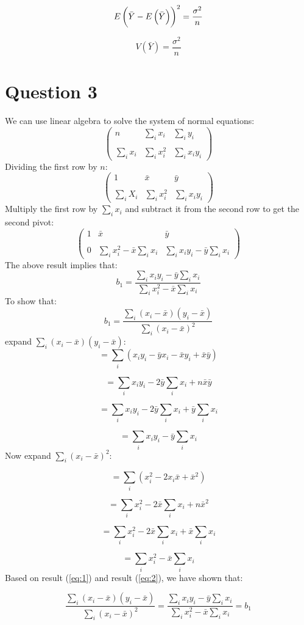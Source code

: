 \documentclass[12pt,a4paper]{article}
\begin{document}
\[
E \left(\bar{Y}-E \left(\bar{Y}\right)\right)^2 = \dfrac{\sigma^2}{n}
\]

\[
V\left(\bar{Y}\right) = \dfrac{\sigma^2}{n}
\]
\clearpage
\section*{Question 3}
We can use linear algebra to solve the system of normal equations:
\[
\begin{pmatrix}
n & \sum_i x_i & \sum_i y_i\\
\\
\sum_i x_i & \sum_i x_i^2 & \sum_i x_i y_i
\end{pmatrix}
\]
Dividing the first row by $n$:
\[
\begin{pmatrix}
1 & \bar{x} & \bar{y}\\
\\
\sum_i X_i & \sum_i x_i^2 & \sum_i x_i y_i
\end{pmatrix}
\]
Multiply the first row by $\sum_i x_i$ and subtract it from the second row to get the second pivot:
\[
\begin{pmatrix}
1 & \bar{x} & \bar{y}\\
\\
0 & \sum_i x_i^2 - \bar{x}\sum_i x_i & \sum_i x_i y_i
 - \bar{y}\sum_i x_i
 \end{pmatrix}
\]
The above result implies that:
\[
b_1 = \dfrac{\sum_i x_i y_i
 - \bar{y}\sum_i x_i}{\sum_i x_i^2 - \bar{x}\sum_i x_i}
\]
To show that:
\[
b_1 = \dfrac{\sum_i\left(x_i-\bar{x}\right)\left(y_i - \bar{x}\right)}{\sum_i\left(x_i-\bar{x}\right)^2}
\]
expand $\sum_i\left(x_i-\bar{x}\right)\left(y_i - \bar{x}\right)$:
\[
= \sum_i\left(x_iy_i-\bar{y}x_i-\bar{x}y_i+\bar{x}\bar{y}\right)
\]

\[
= \sum_i x_i y_i-2\bar{y}\sum_i x_i+n\bar{x}\bar{y}
\]

\[
= \sum_i x_i y_i-2\bar{y}\sum_i x_i+\bar{y}\sum_i x_i
\]

\begin{equation} \label{eq:1}
= \sum_i x_i y_i-\bar{y}\sum_i x_i
\end{equation}
Now expand $\sum_i\left(x_i-\bar{x}\right)^2$:

\[
=\sum_i \left(x_i^2-2x_i\bar{x}+\bar{x}^2\right)
\]

\[
=\sum_i x_i^2-2\bar{x} \sum_i x_i+n \bar{x}^2
\]

\[
=\sum_i x_i^2-2\bar{x} \sum_i x_i+\bar{x}\sum_i x_i
\]

\begin{equation} \label{eq:2}
=\sum_i x_i^2-\bar{x} \sum_i x_i
\end{equation}
Based on result (\ref{eq:1}) and result (\ref{eq:2}), we have shown that:

\[
\dfrac{\sum_i\left(x_i-\bar{x}\right)\left(y_i - \bar{x}\right)}{\sum_i\left(x_i-\bar{x}\right)^2} = \dfrac{\sum_i x_i y_i
 - \bar{y}\sum_i x_i}{\sum_i x_i^2 - \bar{x}\sum_i x_i} = b_1
\]
\end{document}
